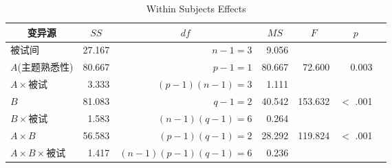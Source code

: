 












\begin{table}[htbp]
	\centering
	\caption{Within Subjects Effects}
	\label{tab:withinSubjectsEffects}
	{
                    \begin{tabular}{lrrrrrr}
		    \toprule
			\multicolumn{1}{c}{变异源} & \multicolumn{1}{c}{$SS$} & \multicolumn{1}{c}{$df$} & \multicolumn{1}{c}{$MS$} & \multicolumn{1}{c}{$F$} & \multicolumn{1}{c}{$p$} \\
		     \midrule
			被试间                 & 27.167    & $n-1=3$     & 9.056   &  &    \\
		      \midrule
			$A$(主题熟悉性)        & 80.667    & $p-1=1$     & 80.667  & 72.600 & 0.003  \\
			$A\times$被试          & 3.333     & $(p-1)(n-1)=3$     & 1.111   &  &    \\
			$B$                    & 81.083    & $q-1=2$     & 40.542 & 153.632 & $<$ .001  \\
			$B\times$被试          & 1.583     & $(n-1)(q-1)=6$     & 0.264   &  &    \\
			$A \times B$           & 56.583    & $(p-1)(q-1)=2$     & 28.292  & 119.824 & $<$ .001  \\
			$A\times B \times$被试 & 1.417     & $(n-1)(p-1)(q-1)=6$     & 0.236   &  &    \\
		      \bottomrule
		\end{tabular}
	}
\end{table}
